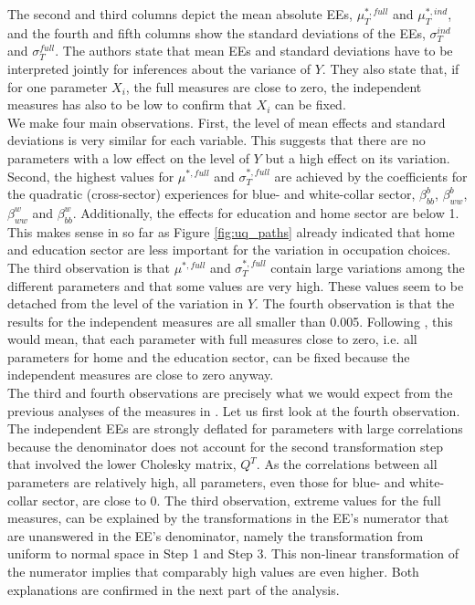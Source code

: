 \noindent
The second and third columns depict the mean absolute EEs, $\mu^{*,full}_T$ and $\mu^{*,ind}_T$, and the fourth and fifth columns show the standard deviations of the EEs, $\sigma^{ind}_T$ and $\sigma^{full}_T$. The authors state that mean EEs and standard deviations have to be interpreted jointly for inferences about the variance of $Y$. They also state that, if for one parameter $X_i$, the full measures are close to zero, the independent measures has also to be low to confirm that $X_i$ can be fixed.\\

\noindent
We make four main observations. First, the level of mean effects and standard deviations is very similar for each variable. This suggests that there are no parameters with a low effect on the level  of $Y$ but a high effect on its variation. Second, the highest values for $\mu^{*,full}$ and $\sigma^{*,full}_T$ are achieved by the coefficients for the quadratic (cross-sector) experiences for blue- and white-collar sector, $\beta^b_{bb}$, $\beta^b_{ww}$, $\beta^w_{ww}$ and $\beta^w_{bb}$. Additionally, the effects for education and home sector are below 1. This makes sense in so far as Figure \ref{fig:uq_paths} already indicated that home and education sector are less important for the variation in occupation choices. The third observation is that $\mu^{*,full}$ and $\sigma^{*,full}_T$ contain large variations among the different parameters and that some values are very high. These values seem to be detached from the level of the variation in $Y$. The fourth observation is that the results for the independent measures are all smaller than 0.005. Following \cite{ge2014efficient}, this would mean, that each parameter with full measures close to zero, i.e. all parameters for home and the education sector, can be fixed because the independent measures are close to zero anyway.\\

\noindent
The third and fourth observations are precisely what we would expect from the previous analyses of the measures in \cite{ge2017extending}. Let us first look at the fourth observation. The independent EEs are strongly deflated for parameters with large correlations because the denominator does not account for the second transformation step that involved the lower Cholesky matrix, $Q^T$. As the correlations between all parameters are relatively high, all parameters, even those for blue- and white-collar sector, are close to 0. The third observation, extreme values for the full measures, can be explained by the transformations in the EE's numerator that are unanswered in the EE's denominator, namely the transformation from uniform to normal space in Step 1 and Step 3. This non-linear transformation of the numerator implies that comparably high values are even higher. Both explanations are confirmed in the next part of the analysis.\\

